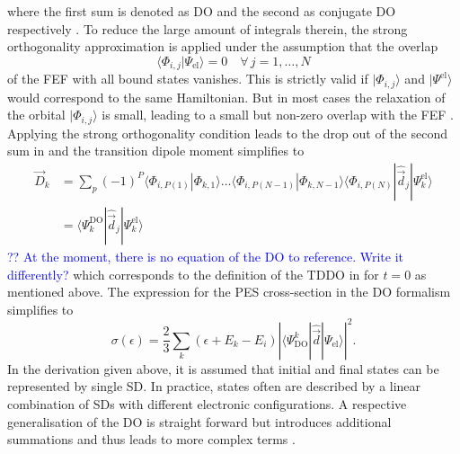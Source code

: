 where the first sum is denoted as DO and the second as conjugate DO respectively \cite{saPonzi}.
To reduce the large amount of integrals therein, the strong orthogonality approximation is applied under the assumption that the overlap 
\begin{equation}
 \langle \Phi_{i,j}  |\Psi_\text{el}\rangle=0 \quad \forall\, j=1,\hdots, N
\end{equation}
of the FEF with all bound states vanishes.
This is strictly valid if $|\Phi_{i,j}\rangle$ and $|\Psi^\text{el}\rangle$ would correspond to the same Hamiltonian.
But in most cases the relaxation of the orbital $|\Phi_{i,j}\rangle$ is small, leading to a small but non-zero overlap with the FEF \cite{saPonzi,GrellKuehn}.
Applying the strong orthogonality condition leads to the drop out of the second sum in  and the transition dipole moment simplifies to
\begin{align} \label{eq:sigma_do}
\vec{D}_k&= \sum_p (-1)^P \langle \Phi_{i,P(1)}  |\Phi_{k,1} \rangle
            \hdots  \langle \Phi_{i,P(N-1)}|\Phi_{k,N-1} \rangle
                   \langle \Phi_{i,P(N)} |\hat{\vec{d}}_j |\Psi_k^\text{el}\rangle \nonumber \\
    &= \langle \Psi_k^\text{DO}| \hat{\vec{d}}_j| \Psi_k^\text{el}\rangle
\end{align}
\textcolor{blue}{?? At the moment, there is no equation of the DO to reference. Write it differently?}
which corresponds to the definition of the TDDO in  for $t=0$ as mentioned above.
The expression for the PES cross-section in the DO formalism simplifies to
\begin{equation} \label{eq:DO_pes}
\sigma(\epsilon) =\frac 23 \sum_k (\epsilon +E_k-E_i)  
             \left|  \langle \Psi^k_\text{DO} | \hat{\vec{d}} | \Psi_\text{el}\rangle  \right|^2 .
\end{equation}
In the derivation given above, it is assumed that initial and final states can be represented by single SD.
In practice, states often are described by a linear combination of SDs with different electronic configurations.
A respective generalisation of the DO is straight forward but introduces additional summations and thus leads to more complex terms \cite{GrellKuehn}.

